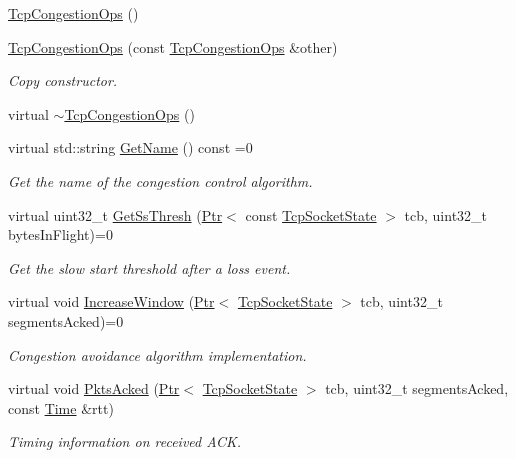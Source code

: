 \begin{DoxyCompactItemize}
\item 
\hyperlink{classns3_1_1TcpCongestionOps_a044982d009b94a2bbf59ed27cdb14e91}{Tcp\+Congestion\+Ops} ()
\item 
\hyperlink{classns3_1_1TcpCongestionOps_afb374a7fa432a9319f220b8b481fc28e}{Tcp\+Congestion\+Ops} (const \hyperlink{classns3_1_1TcpCongestionOps}{Tcp\+Congestion\+Ops} \&other)
\begin{DoxyCompactList}\small\item\em Copy constructor. \end{DoxyCompactList}\item 
virtual \hyperlink{classns3_1_1TcpCongestionOps_aaf257a36d53904cb3c0598ceffc439c3}{$\sim$\+Tcp\+Congestion\+Ops} ()
\item 
virtual std\+::string \hyperlink{classns3_1_1TcpCongestionOps_afb778629819ba3dbf7aaf15b0d57e114}{Get\+Name} () const =0
\begin{DoxyCompactList}\small\item\em Get the name of the congestion control algorithm. \end{DoxyCompactList}\item 
virtual uint32\+\_\+t \hyperlink{classns3_1_1TcpCongestionOps_a504ab8e79dbf8e11c1f2b7120977a8c5}{Get\+Ss\+Thresh} (\hyperlink{classns3_1_1Ptr}{Ptr}$<$ const \hyperlink{classns3_1_1TcpSocketState}{Tcp\+Socket\+State} $>$ tcb, uint32\+\_\+t bytes\+In\+Flight)=0
\begin{DoxyCompactList}\small\item\em Get the slow start threshold after a loss event. \end{DoxyCompactList}\item 
virtual void \hyperlink{classns3_1_1TcpCongestionOps_a3cdceb0ace37bc606d34369ab3f920f0}{Increase\+Window} (\hyperlink{classns3_1_1Ptr}{Ptr}$<$ \hyperlink{classns3_1_1TcpSocketState}{Tcp\+Socket\+State} $>$ tcb, uint32\+\_\+t segments\+Acked)=0
\begin{DoxyCompactList}\small\item\em Congestion avoidance algorithm implementation. \end{DoxyCompactList}\item 
virtual void \hyperlink{classns3_1_1TcpCongestionOps_a76d3ffb7b1a7ba761026e3f94c1f50fa}{Pkts\+Acked} (\hyperlink{classns3_1_1Ptr}{Ptr}$<$ \hyperlink{classns3_1_1TcpSocketState}{Tcp\+Socket\+State} $>$ tcb, uint32\+\_\+t segments\+Acked, const \hyperlink{classns3_1_1Time}{Time} \&rtt)
\begin{DoxyCompactList}\small\item\em Timing information on received A\+CK. \end{DoxyCompactList}\item 

\end{DoxyCompactItemize}
